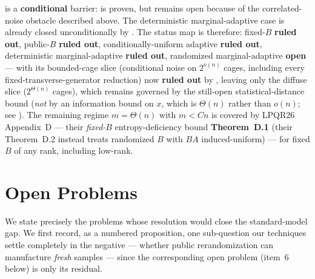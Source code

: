 \documentclass[11pt,a4paper]{article}
\theoremstyle{plain}
\theoremstyle{definition}
\begin{document}
 is a \textbf{conditional} barrier:  is proven, but  remains open because of the correlated-noise obstacle described above.  The deterministic marginal-adaptive case is already closed unconditionally by . The status map is therefore: fixed-$B$ \textbf{ruled out}, public-$B$ \textbf{ruled out}, conditionally-uniform adaptive \textbf{ruled out}, deterministic marginal-adaptive \textbf{ruled out}, randomized marginal-adaptive \textbf{open} --- with its bounded-cage slice (conditional noise on $2^{o(n)}$ cages, including every fixed-transverse-generator reduction) now \textbf{ruled out} by , leaving only the diffuse slice ($2^{\Theta(n)}$ cages), which remains governed by the still-open statistical-distance bound  (\emph{not} by an information bound on $x$, which is $\Theta(n)$ rather than $o(n)$; see ).  The remaining regime $m=\Theta(n)$ with $m<Cn$ is covered by LPQR26 Appendix~D --- their \emph{fixed-$B$} entropy-deficiency bound \textbf{Theorem~D.1} (their Theorem~D.2 instead treats randomized $B$ with $BA$ induced-uniform) --- for fixed $B$ of any rank, including low-rank.

\section{Open Problems}
\label{sec:open}

We state precisely the problems whose resolution would close the standard-model gap. We first record, as a numbered proposition, one sub-question our techniques settle completely in the negative --- whether public rerandomization can manufacture \emph{fresh} samples --- since the corresponding open problem (item~6 below) is only its residual.
\end{document}
